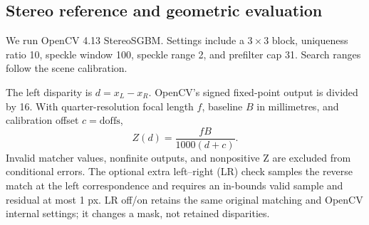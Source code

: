 \documentclass[10pt,twocolumn,letterpaper]{article}
\begin{document}
\begin{center}\begin{minipage}{\linewidth}\centering
{}
\end{minipage}\end{center}

\subsection{Stereo reference and geometric evaluation}
We run OpenCV 4.13 StereoSGBM. Settings include a $3\times3$ block, uniqueness ratio 10, speckle window 100, speckle range 2, and prefilter cap 31. Search ranges follow the scene calibration.

The left disparity is $d=x_L-x_R$. OpenCV's signed fixed-point output is divided by 16. With quarter-resolution focal length $f$, baseline $B$ in millimetres, and calibration offset $c=\mathrm{doffs}$,
\begin{equation}
Z(d)=\frac{fB}{1000(d+c)}.
\label{eq:depth}
\end{equation}
Invalid matcher values, nonfinite outputs, and nonpositive Z are excluded from conditional errors. The optional extra left--right (LR) check samples the reverse match at the left correspondence and requires an in-bounds valid sample and residual at most 1 px. LR off/on retains the same original matching and OpenCV internal settings; it changes a mask, not retained disparities.
\end{document}

